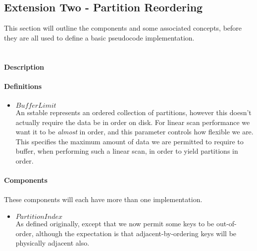 \documentclass[fleqn]{article}
\begin{document}
\clearpage
\subsection{Extension Two - Partition Reordering}
\small
This section will outline the components and some associated concepts, before they are all used to define 
a basic pseudocode implementation.
\\\\
\paragraph{Description}

\paragraph{Definitions}
\begin{itemize}
  \item $BufferLimit$\\[2pt]
    An sstable represents an ordered collection of partitions, however this doesn't
    actually require the data be in order on disk. For linear scan performance we want it
    to be \emph{almost} in order, and this parameter controls how flexible we are.
    This specifies the maximum amount of data we are permitted to require to buffer, 
    when performing such a linear scan, in order to yield partitions in order.
\end{itemize}

\paragraph{Components}
\paragraph{}
These components will each have more than one implementation.
\begin{itemize}
  \item $PartitionIndex$\\[2pt]
    As defined originally, except that we now permit some keys to be out-of-order, although
    the expectation is that adjacent-by-ordering keys will be physically adjacent also.
\end{itemize}
\end{document}
